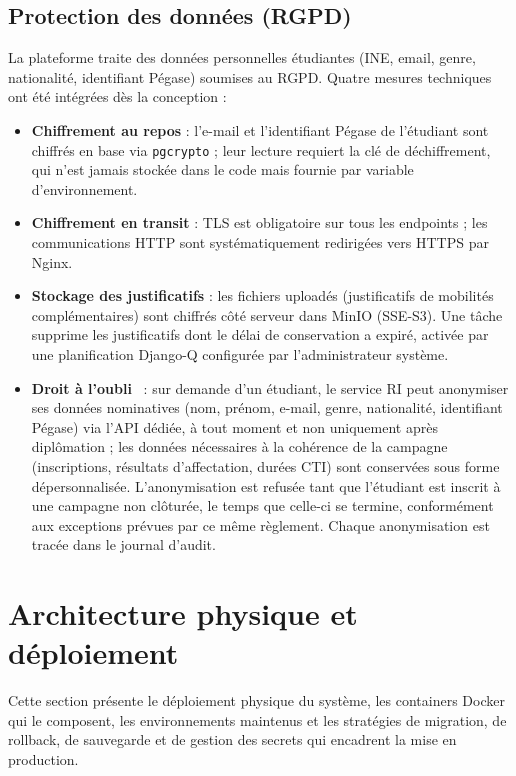 \subsection{Protection des données (RGPD)}

La plateforme traite des données personnelles étudiantes (INE, email, genre, nationalité, identifiant Pégase) soumises au RGPD. Quatre mesures techniques ont été intégrées dès la conception :

\begin{itemize}
  \item \textbf{Chiffrement au repos} : l'e-mail et l'identifiant Pégase de l'étudiant sont chiffrés en base via \texttt{pgcrypto} ; leur lecture requiert la clé de déchiffrement, qui n'est jamais stockée dans le code mais fournie par variable d'environnement.
  \item \textbf{Chiffrement en transit} : TLS est obligatoire sur tous les endpoints ; les communications HTTP sont systématiquement redirigées vers HTTPS par Nginx.
  \item \textbf{Stockage des justificatifs} : les fichiers uploadés (justificatifs de mobilités complémentaires) sont chiffrés côté serveur dans MinIO (SSE-S3). Une tâche supprime les justificatifs dont le délai de conservation a expiré, activée par une planification Django-Q configurée par l'administrateur système.
  \item \textbf{Droit à l'oubli}~\cite{rgpd_2016} : sur demande d'un étudiant, le service RI peut anonymiser ses données nominatives (nom, prénom, e-mail, genre, nationalité, identifiant Pégase) via l'API dédiée, à tout moment et non uniquement après diplômation ; les données nécessaires à la cohérence de la campagne (inscriptions, résultats d'affectation, durées CTI) sont conservées sous forme dépersonnalisée. L'anonymisation est refusée tant que l'étudiant est inscrit à une campagne non clôturée, le temps que celle-ci se termine, conformément aux exceptions prévues par ce même règlement. Chaque anonymisation est tracée dans le journal d'audit.
\end{itemize}
\section{Architecture physique et déploiement}

Cette section présente le déploiement physique du système, les containers Docker qui le composent, les environnements maintenus et les stratégies de migration, de rollback, de sauvegarde et de gestion des secrets qui encadrent la mise en production.

